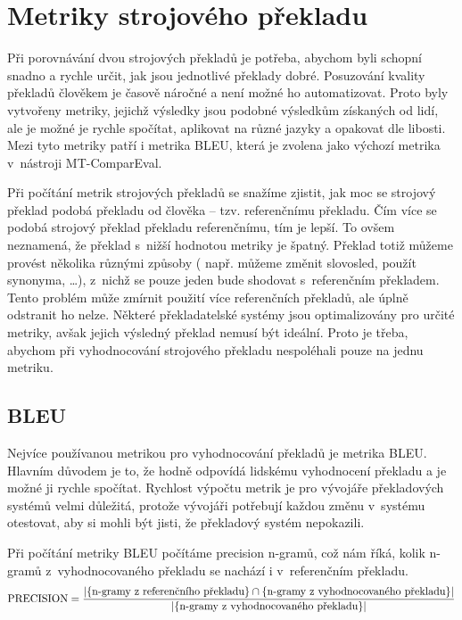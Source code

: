 \chapter{Metriky strojového překladu}
\label{chap:metrics}

Při porovnávání dvou strojových překladů je potřeba,
  abychom byli schopní snadno a rychle určit,
  jak jsou jednotlivé překlady dobré.
Posuzování kvality překladů člověkem je časově náročné
  a není možné ho automatizovat.
Proto byly vytvořeny metriky,
  jejichž výsledky jsou podobné výsledkům získaných od lidí,
  ale je možné je rychle spočítat,
  aplikovat na různé jazyky a opakovat dle libosti.
Mezi tyto metriky patří i metrika BLEU,
  která je zvolena jako výchozí metrika v~nástroji MT-ComparEval.

Při počítání metrik strojových překladů se snažíme zjistit,
  jak moc se strojový překlad podobá překladu od člověka -- tzv. referenčnímu překladu.
Čím více se podobá strojový překlad překladu referenčnímu,
  tím je lepší.
To ovšem neznamená, že překlad s~nižší hodnotou metriky je špatný.
Překlad totiž můžeme provést několika různými způsoby 
  ( např. můžeme změnit slovosled, použít synonyma, \dots ),
  z~nichž se pouze jeden bude shodovat s~referenčním překladem.
Tento problém může zmírnit použití více referenčních překladů,
  ale úplně odstranit ho nelze.
Některé překladatelské systémy jsou optimalizovány pro určité metriky,
  avšak jejich výsledný překlad nemusí být ideální.
Proto je třeba,
  abychom při vyhodnocování strojového překladu nespoléhali pouze na jednu metriku.


\section{BLEU}
Nejvíce používanou metrikou pro vyhodnocování překladů je metrika BLEU.
Hlavním důvodem je to,
  že hodně odpovídá lidskému vyhodnocení překladu
  a je možné ji rychle spočítat.
Rychlost výpočtu metrik je pro vývojáře překladových systémů velmi důležitá,
  protože vývojáři potřebují každou změnu v~systému otestovat,
  aby si mohli být jisti,
  že překladový systém nepokazili.

Při počítání metriky BLEU počítáme precision \mbox{n-gramů},
  což nám říká,
  kolik \mbox{n-gramů} z~vyhodnocovaného překladu se nachází i v~referenčním překladu.	
$$ \text{PRECISION} = \frac{\lvert \lbrace \text{\mbox{n-gramy} z~referenčního překladu} \rbrace \cap \lbrace \text{\mbox{n-gramy} z~vyhodnocovaného překladu} \rbrace \rvert}{\lvert \lbrace \text{\mbox{n-gramy} z~vyhodnocovaného překladu} \rbrace \rvert}$$

